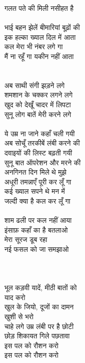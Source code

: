 {{{{{{{{{{{{{{{{{{{{{{{{{{{{{{{{{{{{{गलत पते की मिली नसीहत है\\
\\
 भाई बहन झेलें बीमारियां बूढ़ों की\\
इक हल्का ख्याल दिल में आता\\
कल मेरा भी नंबर लगे गा\\
मैं ना रहूँ गा यकीन नहीं आता\\
\\
\\
अब साथी संगी झड़ने लगे\\
शमशान के चक्कर लगने लगे\\
खुद को देखूँ चादर में लिपटा\\
सुनू लोग बातें मेरी करने लगे\\
\\
ये उम्र ना जाने कहाँ चली गयी\\
अब सोचूँ तरकीबें लंबी करने की\\
दवाइयों की लिस्ट बढ़ती गयी\\
सुनू बात ऑपरेशन और मरने की\\
अनगिनत दिन मिले थे मुझे\\
अधूरी तमन्नाएँ पूरी कर लूँ गा\\
कई ख्याल सपने थे मन में\\
जल्दी क्या है कल कर लूँ गा\\
\\
शाम ढली पर कल नहीं आया\\
इंसाफ़ कहाँ का है बतलाओ\\
मेरा सूरज डूब रहा\\
नई फसल को जा समझाओ\\
\\
\\
\\
भूल कड़वी यादें, मीठी बातों को\\
याद करो\\
खुल के जियो, दूजों का दामन\\
खुशी से भरो\\
चाहे लगे उम्र लंबी पर है छोटी\\
छोड़ शिकायत गिले पछतावा\\
इस पल को रौशन करो\\
इस पल को रौशन करो\\
\\
\\
}}}}}}}}}}}}}}}}}}}}}}}}}}}}}}}}}}}}}
